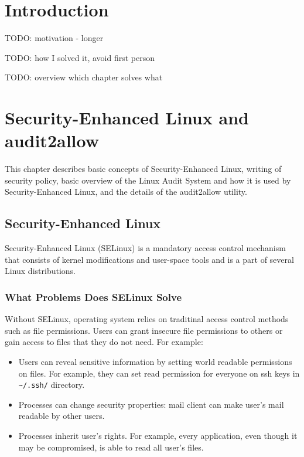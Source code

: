 \chapter{Introduction}
TODO: motivation - longer

TODO: how I solved it, avoid first person

TODO: overview which chapter solves what

\chapter{Security-Enhanced Linux and audit2allow}

This chapter describes basic concepts of Security-Enhanced Linux, writing of
security policy, basic overview of the Linux Audit System and how it is used by
Security-Enhanced Linux, and the details of the audit2allow utility.

\section{Security-Enhanced Linux}

Security-Enhanced Linux (SELinux) is a mandatory access control mechanism that
consists of kernel modifications and user-space tools and is a part of several
Linux distributions.

\subsection{What Problems Does SELinux Solve}
Without SELinux, operating system relies on traditinal access control methods
such as file permissions. Users can grant insecure file permissions to others or
gain access to files that they do not need. For example:
\begin{itemize}
    \item Users can reveal sensitive information by setting world readable
        permissions on files. For example, they can set read permission for
        everyone on ssh keys in \texttt{\textasciitilde/.ssh/} directory.
    \item Processes can change security properties: mail client can make user's
        mail readable by other users.
    \item Processes inherit user's rights. For example, every application, even
        though it may be compromised, is able to read all user's files.
\end{itemize}

